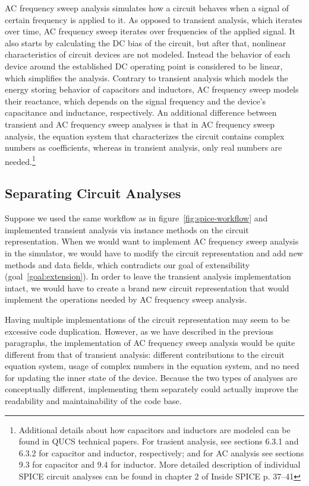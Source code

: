 AC frequency sweep analysis simulates how a circuit behaves when a signal of certain frequency is applied to it. As opposed to transient analysis, which iterates over time, AC frequency sweep iterates over frequencies of the applied signal. It also starts by calculating the DC bias of the circuit, but after that, nonlinear characteristics of circuit devices are not modeled. Instead the behavior of each device around the established DC operating point is considered to be linear, which simplifies the analysis. Contrary to transient analysis which models the energy storing behavior of capacitors and inductors, AC frequency sweep models their reactance, which depends on the signal frequency and the device's capacitance and inductance, respectively. An additional difference between transient and AC frequency sweep analyses is that in AC frequency sweep analysis, the equation system that characterizes the circuit contains complex numbers as coefficients, whereas in transient analysis, only real numbers are needed.\footnote{Additional details about how capacitors and inductors are modeled can be found in QUCS technical papers. For trasient analysis, see sections 6.3.1 and 6.3.2 for capacitor and inductor, respectively; and for AC analysis see sections 9.3 for capacitor and 9.4 for inductor. More detailed description of individual SPICE circuit analyses can be found in chapter 2 of Inside SPICE p. 37--41}

\subsection{Separating Circuit Analyses}
\label{chap:analysis:separation}
Suppose we used the same workflow as in figure~\ref{fig:spice-workflow} and implemented transient analysis via instance methods on the circuit representation. When we would want to implement AC frequency sweep analysis in the simulator, we would have to modify the circuit representation and add new methods and data fields, which contradicts our goal of extensibility (goal~\ref{goal:extension}). In order to leave the transient analysis implementation intact, we would have to create a brand new circuit representation that would implement the operations needed by AC frequency sweep analysis.

Having multiple implementations of the circuit representation may seem to be excessive code duplication. However, as we have described in the previous paragraphs, the implementation of AC frequency sweep analysis would be quite different from that of transient analysis: different contributions to the circuit equation system, usage of complex numbers in the equation system, and no need for updating the inner state of the device. Because the two types of analyses are conceptually different, implementing them separately could actually improve the readability and maintainability of the code base.

